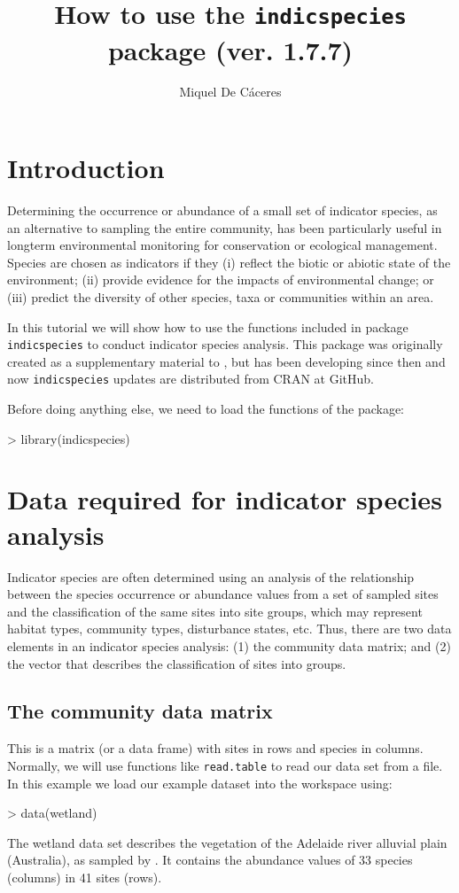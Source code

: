 \documentclass[11pt,a4paper]{article}
\title{How to use the \texttt{indicspecies} package (ver. 1.7.7)}
\author[1]{Miquel De Cáceres}
\affil[1]{CTFC - Forest Sciences and Technology Center of Catalonia, Spain}
\begin{document}

\maketitle
\tableofcontents

\section{Introduction}
Determining the occurrence or abundance of a small set of indicator species, as an alternative to sampling the entire community, has been particularly useful in longterm environmental monitoring for conservation or ecological management. Species are chosen as indicators if they (i) reflect the biotic or abiotic state of the environment; (ii) provide evidence for the impacts of environmental change; or (iii) predict the diversity of other species, taxa or communities within an area. 

In this tutorial we will show how to use the functions included in package \texttt{indicspecies} to conduct indicator species analysis. This package was originally created as a supplementary material to \citet{DeCaceres2009}, but has been developing since then and now \texttt{indicspecies} updates are distributed from CRAN at GitHub. 

Before doing anything else, we need to load the functions of the package:
\begin{Schunk}
\begin{Sinput}
> library(indicspecies)
\end{Sinput}
\end{Schunk}

\section{Data required for indicator species analysis}
Indicator species are often determined using an analysis of the relationship between the species occurrence or abundance values from a set of sampled sites and the classification of the same sites into site groups, which may represent habitat types, community types, disturbance states, etc. Thus, there are two data elements in an indicator species analysis: (1) the community data matrix; and (2) the vector that describes the classification of sites into groups.
\subsection{The community data matrix}
This is a matrix (or a data frame) with sites in rows and species in columns. Normally, we will use functions like \texttt{read.table} to read our data set from a file. In this example we load our example dataset into the workspace using:
\begin{Schunk}
\begin{Sinput}
> data(wetland)
\end{Sinput}
\end{Schunk}
The wetland data set describes the vegetation of the Adelaide river alluvial plain (Australia), as sampled by \citet{Bowman1987}. It contains the abundance values of 33 species (columns) in 41 sites (rows).
\end{document}
